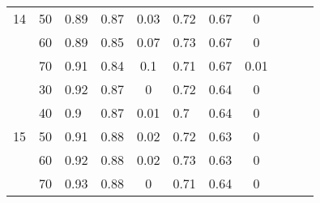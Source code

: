 \begin{table}[htbp]
\begin{tabular}{|c|c|p{3.855em}p{3.07em}c|p{3.855em}p{3.07em}c|ccc|}
    14    & 50    & 0.89  & 0.87  & 0.03  & 0.72  & 0.67  & 0     &       &       &  \\
          & 60    & 0.89  & 0.85  & 0.07  & 0.73  & 0.67  & 0     &       &       &  \\
          & 70    & 0.91  & 0.84  & 0.1   & 0.71  & 0.67  & 0.01  &       &       &  \\
    \midrule
          & 30    & 0.92  & 0.87  & 0     & 0.72  & 0.64  & 0     &       &       &  \\
          & 40    & 0.9   & 0.87  & 0.01  & 0.7   & 0.64  & 0     &       &       &  \\
    15    & 50    & 0.91  & 0.88  & 0.02  & 0.72  & 0.63  & 0     &       &       &  \\
          & 60    & 0.92  & 0.88  & 0.02  & 0.73  & 0.63  & 0     &       &       &  \\
          & 70    & 0.93  & 0.88  & 0     & 0.71  & 0.64  & 0     &       &       &  \\
    \bottomrule
    \end{tabular}%
  \label{tab:addlabel}%
\end{table}%
